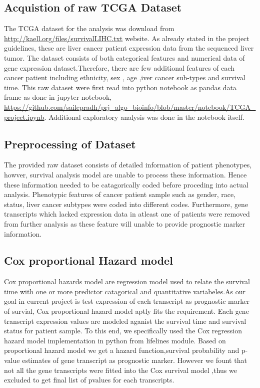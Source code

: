 \documentclass{article}
\begin{document}
	\subsection{Acquistion of raw TCGA Dataset}
The  TCGA dataset for the analysis was download from \url{http://kaell.org/files/survivalLIHC.txt} website. As already stated in the project guidelines, these are liver cancer patient expression data from the sequenced liver tumor. The  dataset consists of both categorical features and numerical data of gene expression dataset.Therefore, there are few additional features of each cancer patient including ethnicity, sex , age ,iver cancer sub-types and survival time. This raw dataset were first read into python notebook as pandas data frame  as done in  jupyter notebook, \url{https://github.com/sailepradh/prj_algo_bioinfo/blob/master/notebook/TCGA_project.ipynb}.  Additional exploratory analysis was done in the notebook itself.

	\subsection {Preprocessing of Dataset}
The provided raw dataset consists of detailed information of patient phenotypes, howver, survival analysis model are unable to process these information. Hence these information needed to be catagorically coded before proceding into actual analysis. Phenotypic features of cancer patient sample such as gender, race, status, liver cancer subtypes were coded into different codes. Furthermore, gene transcripts which lacked expression data in atleast one of patients were removed from further analysis as these feature will unable to provide prognostic marker information.

	\subsection{Cox proportional Hazard model}
	 Cox proportional hazards model are regression model used to relate the survival time with one or more predictor catagorical and quantitative variabeles.As our goal in current project is test expression of each transcript as prognostic marker of survial, Cox proportional hazard model aptly fits the requirement. Each gene transcript expression values are modeled aganist the survival time and survival status for patient sample. To this end, we specifically used the Cox regression hazard model implementation in python from lifelines \cite{lifelines} module. Based on proportional hazard model we get a hazard function,survival probability and p-value estimates of gene transcript as prognostic marker. However we fount that not all the gene transcripts were fitted into the Cox survival model ,thus we excluded to get final list of pvalues for each transcripts.
	 
\end{document}
